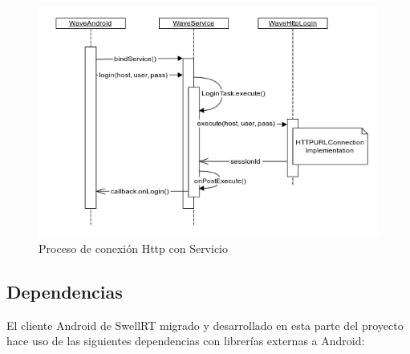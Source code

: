         \begin{figure}[!]
   \centering
	\includegraphics[keepaspectratio, scale=0.6]{Media/Diagrams/loginHttpSequenceDiagram.png}
    \caption{Proceso de conexión Http con Servicio}
   \label{fig:sequenceDiagram_waveHttp}
  \end{figure}
      
    \subsection{Dependencias}
    
    El cliente Android de SwellRT migrado y desarrollado en esta parte del proyecto hace uso de las siguientes dependencias con librerías externas a Android:

